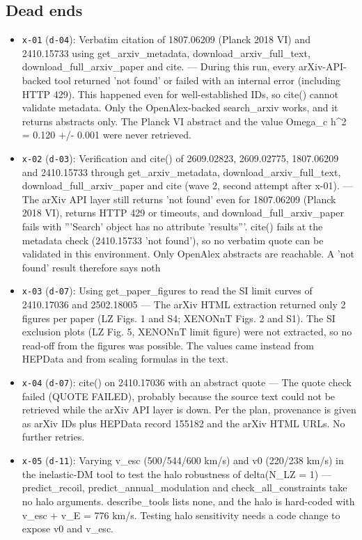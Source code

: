 \documentclass[11pt,a4paper]{article}
\begin{document}
\subsection{Dead ends}
\begin{itemize}
  \item \texttt{x-01} (\texttt{d-04}): Verbatim citation of 1807.06209 (Planck 2018 VI) and 2410.15733 using get\_arxiv\_metadata, download\_arxiv\_full\_text, download\_full\_arxiv\_paper and cite. --- During this run, every arXiv-API-backed tool returned 'not found' or failed with an internal error (including HTTP 429). This happened even for well-established IDs, so cite() cannot validate metadata. Only the OpenAlex-backed search\_arxiv works, and it returns abstracts only. The Planck VI abstract and the value Omega\_c h\textasciicircum{}2 = 0.120 +/- 0.001 were never retrieved.
  \item \texttt{x-02} (\texttt{d-03}): Verification and cite() of 2609.02823, 2609.02775, 1807.06209 and 2410.15733 through get\_arxiv\_metadata, download\_arxiv\_full\_text, download\_full\_arxiv\_paper and cite (wave 2, second attempt after x-01). --- The arXiv API layer still returns 'not found' even for 1807.06209 (Planck 2018 VI), returns HTTP 429 or timeouts, and download\_full\_arxiv\_paper fails with '''Search' object has no attribute 'results'''. cite() fails at the metadata check (2410.15733 'not found'), so no verbatim quote can be validated in this environment. Only OpenAlex abstracts are reachable. A 'not found' result therefore says noth
  \item \texttt{x-03} (\texttt{d-07}): Using get\_paper\_figures to read the SI limit curves of 2410.17036 and 2502.18005 --- The arXiv HTML extraction returned only 2 figures per paper (LZ Figs. 1 and S4; XENONnT Figs. 2 and S1). The SI exclusion plots (LZ Fig. 5, XENONnT limit figure) were not extracted, so no read-off from the figures was possible. The values came instead from HEPData and from scaling formulas in the text.
  \item \texttt{x-04} (\texttt{d-07}): cite() on 2410.17036 with an abstract quote --- The quote check failed (QUOTE FAILED), probably because the source text could not be retrieved while the arXiv API layer is down. Per the plan, provenance is given as arXiv IDs plus HEPData record 155182 and the arXiv HTML URLs. No further retries.
  \item \texttt{x-05} (\texttt{d-11}): Varying v\_esc (500/544/600 km/s) and v0 (220/238 km/s) in the inelastic-DM tool to test the halo robustness of delta(N\_LZ = 1) --- predict\_recoil, predict\_annual\_modulation and check\_all\_constraints take no halo arguments. describe\_tools lists none, and the halo is hard-coded with v\_esc + v\_E = 776 km/s. Testing halo sensitivity needs a code change to expose v0 and v\_esc.
\end{itemize}
\end{document}
